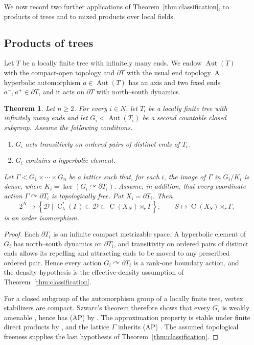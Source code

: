 \documentclass[11pt]{amsart}
\numberwithin{equation}{section}
\newcommand{\Aut}{\operatorname{Aut}}
\newcommand{\rC}{\operatorname{C}}
\newtheorem{theorem}{Theorem}[section]
\theoremstyle{definition}
\begin{document}
	We now record two further applications of Theorem~\ref{thm:classification}, to products of trees
	and to mixed products over local fields.
	
	\subsection{Products of trees}
	
	Let $T$ be a locally finite tree with infinitely many ends.  We endow
	$\Aut(T)$ with the compact-open topology and $\partial T$ with the usual end
	topology.  A hyperbolic automorphism $a\in\Aut(T)$ has an axis and two fixed
	ends $a^-,a^+\in\partial T$, and it acts on $\partial T$ with north--south
	dynamics.
	
	\begin{theorem}
		\label{thm:dani-products-trees}
		Let $n\geq2$.  For every $i\in N$, let $T_i$ be a locally finite tree with
		infinitely many ends and let $G_i<\Aut(T_i)$ be a second countable closed
		subgroup. Assume the following conditions.
		\begin{enumerate}[\rm (i)]
			\item $G_i$ acts transitively on ordered pairs of distinct ends of $T_i$.
			\item $G_i$ contains a hyperbolic element.
		\end{enumerate}
		Let $\Gamma<G_1\times\cdots\times G_n$ be a lattice such that, for each $i$,
		the image of $\Gamma$ in $G_i/K_i$ is dense, where
		$K_i=\ker(G_i\curvearrowright\partial T_i)$. Assume,
		in addition, that every coordinate action
		$\Gamma\curvearrowright\partial T_i$ is topologically free. Put
		$X_i=\partial T_i$. Then
		\[
		2^N\longrightarrow
		\left\{\mathcal D\mid
		\rC^*_{\lambda}(\Gamma)\subset\mathcal D\subset
		\rC(X_N)\rtimes_r\Gamma\right\},
		\qquad
		S\longmapsto\rC(X_S)\rtimes_r\Gamma,
		\]
		is an order isomorphism.
	\end{theorem}
	
	\begin{proof}
		Each $\partial T_i$ is an infinite compact metrizable space.  A hyperbolic
		element of $G_i$ has north--south dynamics on $\partial T_i$, and transitivity
		on ordered pairs of distinct ends allows its repelling and attracting ends to
		be moved to any prescribed ordered pair. Hence every action
		$G_i\curvearrowright\partial T_i$ is a rank-one boundary action, and the
		density hypothesis is the effective-density assumption of Theorem~\ref{thm:classification}.
		
		For a closed subgroup of the automorphism group of a locally finite tree,
		vertex stabilizers are compact. Szwarc's theorem therefore shows that every
		$G_i$ is weakly amenable \cite[Theorem~6]{Sz91}, hence has {\rm(AP)} by
		\cite[Theorem~1.12]{HK94}. The approximation property is stable under finite
		direct products by \cite[Theorem~1.15]{HK94}, and the lattice $\Gamma$ inherits
		{\rm(AP)}
		\cite[Theorem~2.4]{HK94}. The assumed topological freeness supplies the last
		hypothesis of Theorem~\ref{thm:classification}.
	\end{proof}
	
\end{document}
